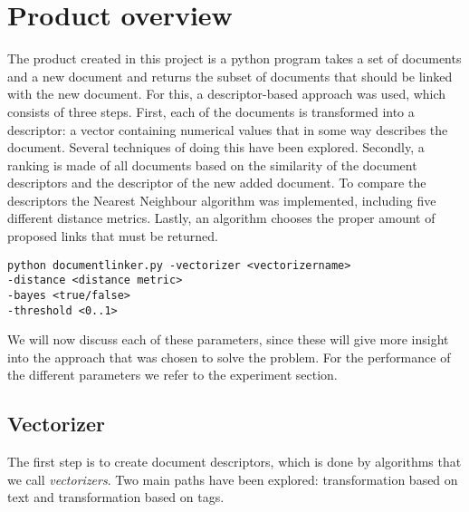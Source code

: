 \section{Product overview}

The product created in this project is a python program takes a set of documents and a new document and returns the subset of documents that should be linked with the new document. For this, a descriptor-based approach was used, which consists of three steps. First, each of the documents is transformed into a descriptor: a vector containing numerical values that in some way describes the document. Several techniques of doing this have been explored. Secondly, a ranking is made of all documents based on the similarity of the document descriptors and the descriptor of the new added document. To compare the descriptors the Nearest Neighbour algorithm was implemented, including five different distance metrics. Lastly, an algorithm chooses the proper amount of proposed links that must be returned.

\begin{lstlisting}
python documentlinker.py -vectorizer <vectorizername> 
-distance <distance metric> 
-bayes <true/false>
-threshold <0..1>
\end{lstlisting}

We will now discuss each of these parameters, since these will give more insight into the approach that was chosen to solve the problem. For the performance of the different parameters we refer to the experiment section. 

\subsection{Vectorizer}
The first step is to create document descriptors, which is done by algorithms that we call \emph{vectorizers}. Two main paths have been explored: transformation based on text and transformation based on tags.

